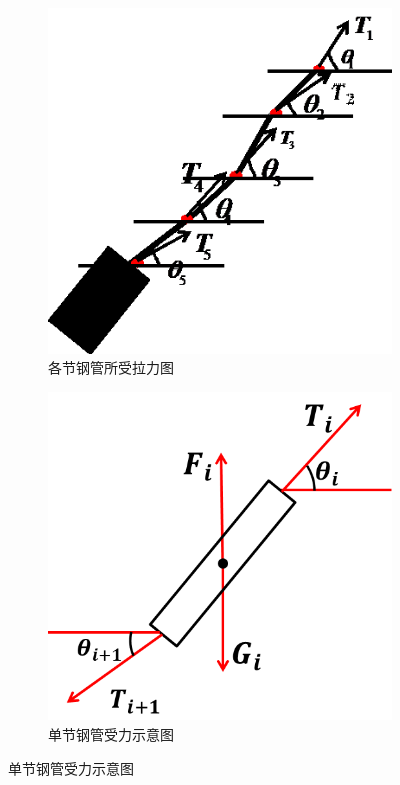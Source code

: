 \documentclass[UTF8]{ctexbook}
\theoremstyle{nonumberplain}
\begin{document}
           \begin{figure}[H]
                \centering
                \begin{subfigure}[b]{0.25\textwidth}
                    \includegraphics[width=\textwidth]{images/every_steel_force_analysis.jpg}
                    \caption{各节钢管所受拉力图}
                    \label{fig:各节钢管所受拉力图}
                \end{subfigure}
                \qquad
                \begin{subfigure}[b]{0.25\textwidth}
                    \includegraphics[width=\textwidth]{images/one_steel_force_analysis.jpg}
                    \caption{单节钢管受力示意图}
                    \label{fig:单节钢管受力示意图}
                \end{subfigure}
            \end{figure}
\end{document}
